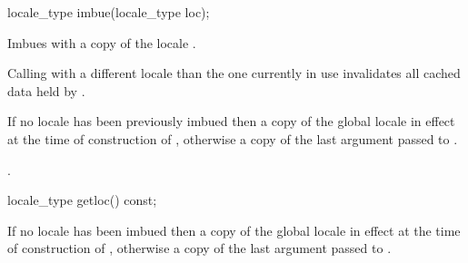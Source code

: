 %
%
\begin{itemdecl}
locale_type imbue(locale_type loc);
\end{itemdecl}

\begin{itemdescr}
\pnum
\effects  Imbues  with a copy of the
locale . \begin{note} Calling  with a
different locale than the one currently in use invalidates all cached
data held by . \end{note}

\pnum
\returns If no locale has been previously imbued then a copy of the
global locale in effect at the time of construction of ,
otherwise a copy of the last argument passed to .

\pnum
\ensures  {}.
\end{itemdescr}

%
%
\begin{itemdecl}
locale_type getloc() const;
\end{itemdecl}

\begin{itemdescr}
\pnum
\returns If no locale has been imbued then a copy of the global locale
in effect at the time of construction of , otherwise a copy of
the last argument passed to .
\end{itemdescr}

